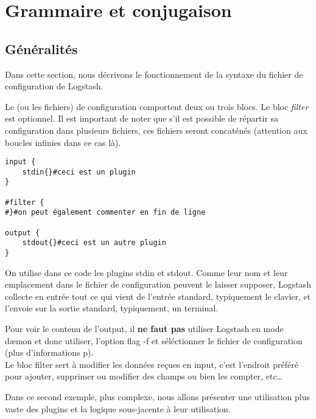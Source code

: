 \section{Grammaire et conjugaison}
\subsection{Généralités}
Dans cette section, nous décrivons le fonctionnement de la syntaxe du fichier de 
configuration de Logstash.

Le (ou les fichiers) de configuration comportent deux ou trois blocs. 
Le bloc \emph{filter} est optionnel.
Il est important de noter que s'il est possible de répartir sa configuration dans
plusieurs fichiers, ces fichiers seront concaténés (attention aux boucles infinies
dans ce cas là).

\begin{lstlisting}[style=logstash,label={lst:conflogstashminimale},caption={Configuration minimale}]
input {
    stdin{}#ceci est un plugin
}

#filter {
#}#on peut également commenter en fin de ligne

output {
    stdout{}#ceci est un autre plugin
}
\end{lstlisting}

On utilise dans ce code les plugins stdin et stdout. Comme leur nom et leur emplacement
dans le fichier de configuration peuvent le laisser supposer,
Logstash collecte en entrée tout ce qui vient de l'entrée standard, typiquement
le clavier, et l'envoie sur la sortie standard, typiquement, un terminal.

Pour voir le contenu de l'output, il \textbf{ne faut pas} utiliser Logstash en mode dæmon 
et donc utiliser, l'option flag -f et séléctionner le fichier de configuration  
(plus d'informations p\pageref{subsec:logstashflag}).\\[4mm]

Le bloc filter sert à modifier les données reçues en input, c'est l'endroit préféré
pour ajouter, supprimer ou modifier des champs ou bien les compter, etc\ldots


Dans ce second exemple, plus complexe, nous allons présenter une utilisation plus
vaste des plugins et la logique sous-jacente à leur utilisation.

